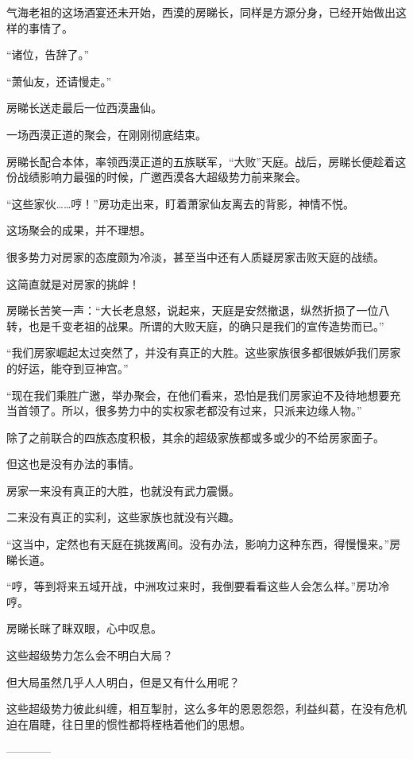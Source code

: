 \begin{this_body}
气海老祖的这场酒宴还未开始，西漠的房睇长，同样是方源分身，已经开始做出这样的事情了。

“诸位，告辞了。”

“萧仙友，还请慢走。”

房睇长送走最后一位西漠蛊仙。

一场西漠正道的聚会，在刚刚彻底结束。

房睇长配合本体，率领西漠正道的五族联军，“大败”天庭。战后，房睇长便趁着这份战绩影响力最强的时候，广邀西漠各大超级势力前来聚会。

“这些家伙……哼！”房功走出来，盯着萧家仙友离去的背影，神情不悦。

这场聚会的成果，并不理想。

很多势力对房家的态度颇为冷淡，甚至当中还有人质疑房家击败天庭的战绩。

这简直就是对房家的挑衅！

房睇长苦笑一声：“大长老息怒，说起来，天庭是安然撤退，纵然折损了一位八转，也是千变老祖的战果。所谓的大败天庭，的确只是我们的宣传造势而已。”

“我们房家崛起太过突然了，并没有真正的大胜。这些家族很多都很嫉妒我们房家的好运，能夺到豆神宫。”

“现在我们乘胜广邀，举办聚会，在他们看来，恐怕是我们房家迫不及待地想要充当首领了。所以，很多势力中的实权家老都没有过来，只派来边缘人物。”

除了之前联合的四族态度积极，其余的超级家族都或多或少的不给房家面子。

但这也是没有办法的事情。

房家一来没有真正的大胜，也就没有武力震慑。

二来没有真正的实利，这些家族也就没有兴趣。

“这当中，定然也有天庭在挑拨离间。没有办法，影响力这种东西，得慢慢来。”房睇长道。

“哼，等到将来五域开战，中洲攻过来时，我倒要看看这些人会怎么样。”房功冷哼。

房睇长眯了眯双眼，心中叹息。

这些超级势力怎么会不明白大局？

但大局虽然几乎人人明白，但是又有什么用呢？

这些超级势力彼此纠缠，相互掣肘，这么多年的恩恩怨怨，利益纠葛，在没有危机迫在眉睫，往日里的惯性都将桎梏着他们的思想。

------------

\end{this_body}

